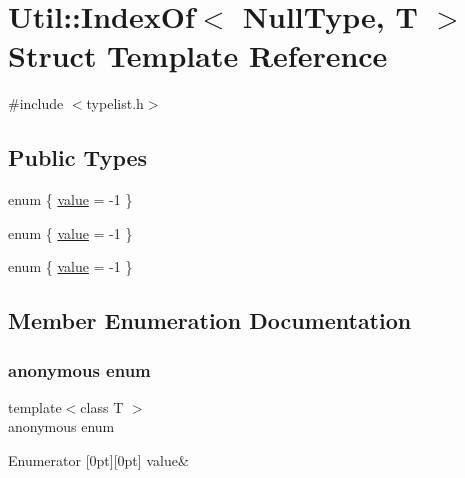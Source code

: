 \hypertarget{structUtil_1_1TL_1_1IndexOf_3_01NullType_00_01T_01_4}{}\section{Util\+:\+:Index\+Of$<$ Null\+Type, T $>$ Struct Template Reference}
\label{structUtil_1_1TL_1_1IndexOf_3_01NullType_00_01T_01_4}


{\ttfamily \#include $<$typelist.\+h$>$}

\subsection*{Public Types}
\begin{DoxyCompactItemize}
\item 
enum \{ \mbox{\hyperlink{structUtil_1_1TL_1_1IndexOf_3_01NullType_00_01T_01_4_afe447148141f7ffca0c03ac8d4c3f09eab7ce1862f00c3baa377293bbd01efe32}{value}} = -\/1
 \}
\item 
enum \{ \mbox{\hyperlink{structUtil_1_1TL_1_1IndexOf_3_01NullType_00_01T_01_4_afe447148141f7ffca0c03ac8d4c3f09eab7ce1862f00c3baa377293bbd01efe32}{value}} = -\/1
 \}
\item 
enum \{ \mbox{\hyperlink{structUtil_1_1TL_1_1IndexOf_3_01NullType_00_01T_01_4_afe447148141f7ffca0c03ac8d4c3f09eab7ce1862f00c3baa377293bbd01efe32}{value}} = -\/1
 \}
\end{DoxyCompactItemize}


\subsection{Member Enumeration Documentation}
\mbox{\label{structUtil_1_1TL_1_1IndexOf_3_01NullType_00_01T_01_4_ad4db28c1e8cb3a6e57608c586ed3b3b6}} 
\subsubsection{\texorpdfstring{anonymous enum}{anonymous enum}}
{\footnotesize\ttfamily template$<$class T $>$ \\
anonymous enum}

\begin{DoxyEnumFields}{Enumerator}
[0pt][0pt]{}\mbox{\label{structUtil_1_1TL_1_1IndexOf_3_01NullType_00_01T_01_4_afe447148141f7ffca0c03ac8d4c3f09eab7ce1862f00c3baa377293bbd01efe32}} 
value&\\
\hline

\end{DoxyEnumFields}
\mbox{\label{structUtil_1_1TL_1_1IndexOf_3_01NullType_00_01T_01_4_aa7e6a49448f149e1e7dab1e44ccf5c12}} 
